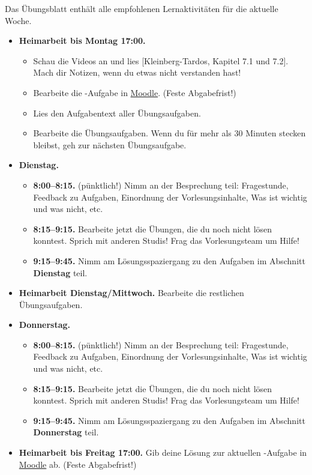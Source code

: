\documentclass{uebung_cs}
\begin{document}
Das Übungsblatt enthält alle empfohlenen Lernaktivitäten für die aktuelle Woche.

\begin{itemize}
\item \textbf{Heimarbeit bis Montag 17:00.}
    \begin{itemize}
    \item 
    Schau die Videos an und lies [Kleinberg-Tardos, Kapitel 7.1 und 7.2]. Mach dir Notizen, wenn du etwas nicht verstanden hast!
    \item Bearbeite die -Aufgabe in \href{https://moodle.studiumdigitale.uni-frankfurt.de/moodle/course/view.php?id=2241}{Moodle}. (Feste Abgabefrist!)
    \item Lies den Aufgabentext aller Übungsaufgaben.
    \item Bearbeite die Übungsaufgaben. Wenn du für mehr als 30 Minuten stecken bleibst, geh zur nächsten Übungsaufgabe.
    \end{itemize}
\item \textbf{Dienstag.}
\begin{itemize}
    \item \textbf{8:00--8:15.} (pünktlich!) Nimm an der Besprechung teil: Fragestunde, Feedback zu Aufgaben, Einordnung der Vorlesungsinhalte, Was ist wichtig und was nicht, etc.
    \item \textbf{8:15--9:15.} Bearbeite jetzt die Übungen, die du noch nicht lösen konntest. Sprich mit anderen Studis! Frag das Vorlesungsteam um Hilfe!
    \item \textbf{9:15--9:45.} Nimm am Lösungsspaziergang zu den Aufgaben im Abschnitt \textbf{Dienstag} teil.
\end{itemize}
\item \textbf{Heimarbeit Dienstag/Mittwoch.} Bearbeite die restlichen Übungsaufgaben.
\item \textbf{Donnerstag.}
    \begin{itemize}
        \item \textbf{8:00--8:15.} (pünktlich!) Nimm an der Besprechung teil: Fragestunde, Feedback zu Aufgaben, Einordnung der Vorlesungsinhalte, Was ist wichtig und was nicht, etc.
        \item \textbf{8:15--9:15.} Bearbeite jetzt die Übungen, die du noch nicht lösen konntest. Sprich mit anderen Studis! Frag das Vorlesungsteam um Hilfe!
        \item \textbf{9:15--9:45.} Nimm am Lösungsspaziergang zu den Aufgaben im Abschnitt \textbf{Donnerstag} teil.
    \end{itemize}
\item \textbf{Heimarbeit bis Freitag 17:00.} Gib deine Lösung zur aktuellen -Aufgabe in \href{https://moodle.studiumdigitale.uni-frankfurt.de/moodle/course/view.php?id=2241}{Moodle} ab. (Feste Abgabefrist!)
\end{itemize}
\end{document}
